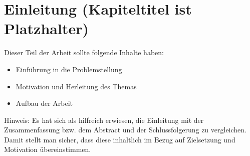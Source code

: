\section{Einleitung (Kapiteltitel ist Platzhalter)}

Dieser Teil der Arbeit sollte folgende Inhalte haben:

\begin{itemize}
 \item Einführung in die Problemstellung
 \item Motivation und Herleitung des Themas
 \item Aufbau der Arbeit
\end{itemize}

Hinweis:
Es hat sich als hilfreich erwiesen, die Einleitung mit der Zusammenfassung bzw. dem  Abstract und der Schlussfolgerung zu vergleichen. Damit stellt man sicher, dass diese inhaltlich im Bezug auf Zielsetzung und Motivation übereinstimmen.


